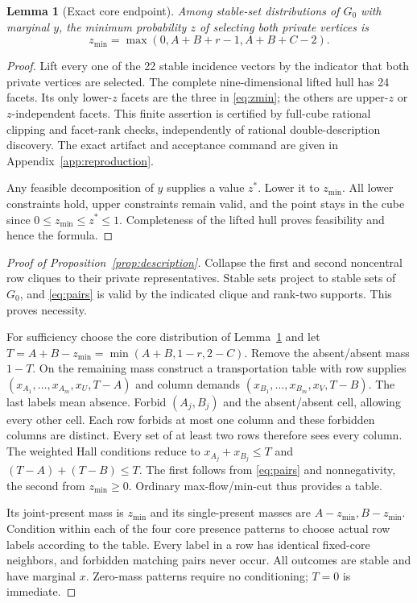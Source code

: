 \documentclass[11pt,a4paper]{article}
\newtheorem{lemma}[theorem]{Lemma}
\theoremstyle{remark}\newtheorem{remark}[theorem]{Remark}
\begin{document}
\begin{lemma}[Exact core endpoint]\label{lem:endpoint}
Among stable-set distributions of $G_0$ with marginal $y$, the minimum
probability $z$ of selecting both private vertices is
\begin{equation}\label{eq:zmin}
 z_{\min}=\max(0,A+B+r-1,A+B+C-2).
\end{equation}
\end{lemma}
\begin{proof}
Lift every one of the 22 stable incidence vectors by the indicator that
both private vertices are selected. The complete nine-dimensional
lifted hull has 24 facets. Its only lower-$z$ facets are the three in
\eqref{eq:zmin}; the others are upper-$z$ or $z$-independent facets.
This finite assertion is certified by full-cube rational clipping and
facet-rank checks, independently of rational double-description discovery.
The exact artifact and acceptance command are given in
Appendix~\ref{app:reproduction}.

Any feasible decomposition of $y$ supplies a value $z^*$. Lower it to
$z_{\min}$. All lower constraints hold, upper constraints remain valid,
and the point stays in the cube since $0\leq z_{\min}\leq z^*\leq1$.
Completeness of the lifted hull proves feasibility and hence the formula.
\end{proof}

\begin{proof}[Proof of Proposition~\ref{prop:description}]
Collapse the first and second noncentral row cliques to their private
representatives. Stable sets project to stable sets of $G_0$, and
\eqref{eq:pairs} is valid by the indicated clique and rank-two supports.
This proves necessity.

For sufficiency choose the core distribution of Lemma~\ref{lem:endpoint}
and let $T=A+B-z_{\min}=\min(A+B,1-r,2-C)$.
Remove the absent/absent mass $1-T$. On the remaining mass construct a
transportation table with row supplies
$(x_{A_1},\ldots,x_{A_m},x_U,T-A)$ and column demands
$(x_{B_1},\ldots,x_{B_m},x_V,T-B)$. The last labels mean absence.
Forbid $(A_j,B_j)$ and the absent/absent cell, allowing every other cell.
Each row forbids at most one column and these forbidden columns are
distinct. Every set of at least two rows therefore sees every column.
The weighted Hall conditions reduce to
$x_{A_j}+x_{B_j}\leq T$ and $(T-A)+(T-B)\leq T$.
The first follows from \eqref{eq:pairs} and nonnegativity, the second
from $z_{\min}\geq0$. Ordinary max-flow/min-cut thus provides a table.

Its joint-present mass is $z_{\min}$ and its single-present masses are
$A-z_{\min},B-z_{\min}$. Condition within each of the four core
presence patterns to choose actual row labels according to the table.
Every label in a row has identical fixed-core neighbors, and forbidden
matching pairs never occur. All outcomes are stable and have marginal
$x$. Zero-mass patterns require no conditioning; $T=0$ is immediate.
\end{proof}
\end{document}

